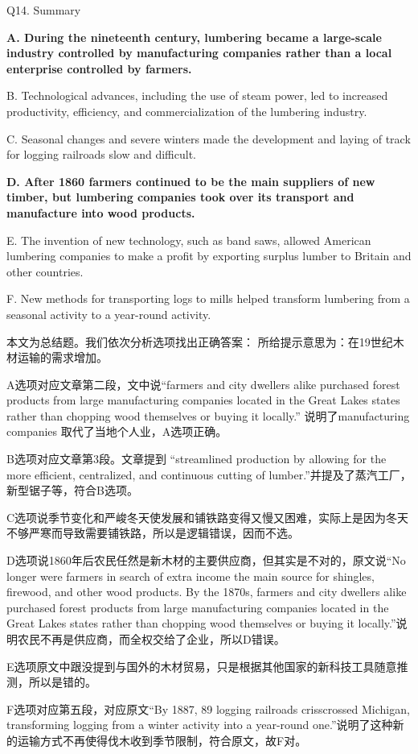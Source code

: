 \begin{blk}
    \begin{qst}
        Q14. Summary
    \end{qst}

    \begin{chc}
        \textbf{A. During the nineteenth century, lumbering became a large-scale industry controlled by manufacturing companies rather than a local enterprise controlled by farmers.}

        B. Technological advances, including the use of steam power, led to increased productivity, efficiency, and commercialization of the lumbering industry.

        C. Seasonal changes and severe winters made the development and laying of track for logging railroads slow and difficult.

        \textbf{D. After 1860 farmers continued to be the main suppliers of new timber, but lumbering companies took over its transport and manufacture into wood products.}

        E. The invention of new technology, such as band saws, allowed American lumbering companies to make a profit by exporting surplus lumber to Britain and other countries.

        F. New methods for transporting logs to mills helped transform lumbering from a seasonal activity to a year-round activity.
    \end{chc}

    \begin{nlz}
        本文为总结题。我们依次分析选项找出正确答案： 所给提示意思为：在19世纪木材运输的需求增加。

        A选项对应文章第二段，文中说“farmers and city dwellers alike purchased forest products from large manufacturing companies located in the Great Lakes states rather than chopping wood themselves or buying it locally.” 说明了manufacturing companies 取代了当地个人业，A选项正确。

        B选项对应文章第3段。文章提到 “streamlined production by allowing for the more efficient, centralized, and continuous cutting of lumber.”并提及了蒸汽工厂，新型锯子等，符合B选项。

        C选项说季节变化和严峻冬天使发展和铺铁路变得又慢又困难，实际上是因为冬天不够严寒而导致需要铺铁路，所以是逻辑错误，因而不选。

        D选项说1860年后农民任然是新木材的主要供应商，但其实是不对的，原文说“No longer were farmers in search of extra income the main source for shingles, firewood, and other wood products. By the 1870s, farmers and city dwellers alike purchased forest products from large manufacturing companies located in the Great Lakes states rather than chopping wood themselves or buying it locally.”说明农民不再是供应商，而全权交给了企业，所以D错误。

        E选项原文中跟没提到与国外的木材贸易，只是根据其他国家的新科技工具随意推测，所以是错的。

        F选项对应第五段，对应原文“By 1887, 89 logging railroads crisscrossed Michigan, transforming logging from a winter activity into a year-round one.”说明了这种新的运输方式不再使得伐木收到季节限制，符合原文，故F对。
    \end{nlz}
\end{blk}
